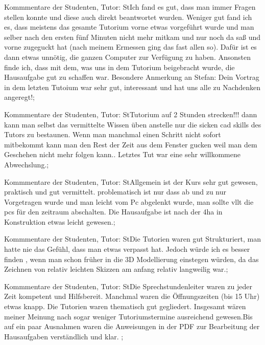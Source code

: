 \documentclass[10pt]{beamer}
\begin{document}
\begin{frame}[fragile]{Kommmentare der Studenten, Tutor: St}Ich fand es gut, dass man immer Fragen stellen konnte und diese auch direkt beantwortet wurden.  Weniger gut fand ich es, dass meistens das gesamte Tutorium vorne etwas vorgeführt wurde und man selber nach den ersten fünf Minuten nicht mehr mitkam und nur noch da saß und vorne zugeguckt hat (nach meinem Ermessen ging das fast allen so). Dafür ist es dann etwas unnötig, die ganzen Computer zur Verfügung zu haben. Ansonsten finde ich, dass mit dem, was uns in dem Tutorium beigebracht wurde, die Hausaufgabe gut zu schaffen war. Besondere Anmerkung an Stefan: Dein Vortrag in dem letzten Tutoium war sehr gut, interessant und hat uns alle zu Nachdenken angeregt!;
 \end{frame}
\begin{frame}[fragile]{Kommmentare der Studenten, Tutor: St}Tutorium auf 2 Stunden strecken!!! dann kann man selbst das vermittelte Wissen üben anstelle nur die sicken cad skills des Tutors zu bestaunen. Wenn man manchmal einen Schritt nicht sofort mitbekommt kann man den Rest der Zeit aus dem Fenster gucken weil man dem Geschehen nicht mehr folgen kann..  Letztes Tut war eine sehr willkommene Abwechslung.;
 \end{frame}
\begin{frame}[fragile]{Kommmentare der Studenten, Tutor: St}Allgemein ist der Kurs sehr gut gewesen, praktisch und gut vermittelt.
 problematisch ist nur dass ab und zu nur Vorgetragen wurde und man leicht vom Pc abgelenkt wurde, man sollte vllt die pcs für den zeitraum abschalten.
 Die Hausaufgabe ist nach der 4ha in Konstruktion etwas leicht gewesen.;
 \end{frame}
\begin{frame}[fragile]{Kommmentare der Studenten, Tutor: St}Die Tutorien waren gut Strukturiert, man hatte nie das Gefühl, dass man etwas verpasst hat. Jedoch würde ich es besser finden , wenn man schon früher in die 3D Modellierung einstegen würden, da das Zeichnen von relativ leichten Skizzen am anfang relativ langweilig war.;
 \end{frame}
\begin{frame}[fragile]{Kommmentare der Studenten, Tutor: St}Die Sprechstundenleiter waren zu jeder Zeit kompetent und Hilfsbereit. Manchmal waren die Öffnungszeiten (bis 15 Uhr) etwas knapp. Die Tutorien waren thematisch gut gegliedert. Insgesamt wären meiner Meinung nach sogar weniger Tutoriumstermine ausreichend gewesen.Bis auf ein paar Ausnahmen waren die Anweisungen in der PDF zur Bearbeitung der Hausaufgaben verständlich und klar.  ;
 \end{frame}
\end{document}
